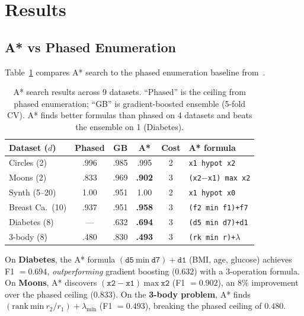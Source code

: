 \documentclass[journal]{IEEEtran}
\begin{document}
\section{Results}

\subsection{A* vs Phased Enumeration}

Table~\ref{tab:astar_vs_phased} compares A* search to the phased
enumeration baseline from~\cite{bond2026phased}.

\begin{table}[h]
\caption{A* search results across 9 datasets. ``Phased'' is the
ceiling from phased enumeration; ``GB'' is gradient-boosted ensemble
(5-fold CV). A* finds better formulas than phased on 4 datasets
and beats the ensemble on 1 (Diabetes).}
\label{tab:astar_vs_phased}
\scriptsize
\begin{tabular}{@{}lccccl@{}}
\toprule
Dataset ($d$) & Phased & GB & A* & Cost & A* formula \\
\midrule
Circles (2) & .996 & .985 & .995 & 2 & \texttt{x1 hypot x2} \\
Moons (2) & .833 & .969 & \textbf{.902} & 3 & \texttt{(x2$-$x1) max x2} \\
Synth (5--20) & 1.00 & .951 & 1.00 & 2 & \texttt{x1 hypot x0} \\
Breast Ca.\ (10) & .937 & .951 & \textbf{.958} & 3 & \texttt{(f2 min f1)+f7} \\
Diabetes (8) & --- & .632 & \textbf{.694} & 3 & \texttt{(d5 min d7)+d1} \\
3-body (8) & .480 & .830 & \textbf{.493} & 3 & \texttt{(rk min r)+$\lambda$} \\
\bottomrule
\end{tabular}
\end{table}

On \textbf{Diabetes}, the A* formula $(\texttt{d5}~\mathrm{min}~
\texttt{d7}) + \texttt{d1}$ (BMI, age, glucose) achieves F1 $= 0.694$,
\emph{outperforming} gradient boosting ($0.632$) with a 3-operation
formula. On \textbf{Moons}, A* discovers
$(\texttt{x2} - \texttt{x1})~\mathrm{max}~\texttt{x2}$ (F1 $= 0.902$),
an 8\% improvement over the phased ceiling ($0.833$). On the
\textbf{3-body problem}, A* finds
$(\mathrm{rank}~\mathrm{min}~r_2/r_1) + \lambda_\mathrm{min}$
(F1 $= 0.493$), breaking the phased ceiling of $0.480$.
\end{document}
